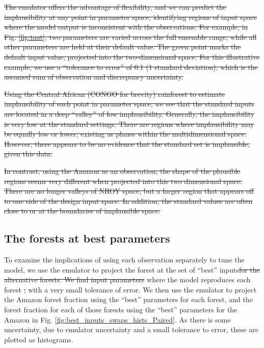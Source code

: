 \documentclass[esd, article]{copernicus} %
\providecommand{\DIFadd}[1]{{\protect\color{blue}\uwave{#1}}} %
\providecommand{\DIFdel}[1]{{\protect\color{red}\sout{#1}}}                      %
\providecommand{\DIFaddbegin}{} %
\providecommand{\DIFaddend}{} %
\providecommand{\DIFdelbegin}{} %
\providecommand{\DIFdelend}{} %
\begin{document}
\DIFdelbegin \DIFdel{The emulator offers the advantage of flexibility, and we can predict the implausibility at any point in parameter space, identifying regions of input space where the model output is inconsistent with the observations. For example, in Fig.  \ref{fig:taat}, two parameters are varied across the full ensemble range, while all other parameters are held at their default value. The green point marks the default input value, projected into the two-dimensional space. For this illustrative example, we use a ``tolerance to error'' of 0.1 (1 standard deviation), which is the assumed sum of observation and discrepancy uncertainty.
}%

\DIFdel{Using the Central African (CONGO for brevity) rainforest to estimate implausibility of each point in parameter space, we see that the standard inputs are located in a deep ``valley'' of low implausibility. Generally, the implausibility is very low at the standard settings. There are regions where implausibility may be equally low or lower, existing as planes within the multidimensional space. However, there appears to be no evidence that the standard set is implausible, given this data.
}%

\DIFdel{In contrast, using the Amazon as an observation, the shape of the plausible regions seems very different when projected into this two dimensional space. There are no longer valleys of NROY space, but a larger region that appears off to one side of the design input space. In addition, the standard values are often close to or at the boundaries of implausible space.
}%


\DIFdelend \subsection{The forests at best parameters}\label{ssec:bestparameters}
To examine the implications of using each observation separately to tune the model, we use the emulator to project the \DIFaddbegin \DIFadd{each }\DIFaddend forest at the set of ``best'' inputs\DIFdelbegin \DIFdel{for the alternative forests. We find input parameters }\DIFdelend \DIFaddbegin \DIFadd{: those }\DIFaddend where the model reproduces each forest \DIFdelbegin \DIFdel{, }\DIFdelend with a very small tolerance of error. We then use the emulator to project the Amazon forest fraction using the ``best'' parameters for each forest, and the forest fraction for each of those forests using the ``best'' parameters for the Amazon in Fig. \ref{fig:best_inputs_swaps_hists_Paired}. As there is some uncertainty, due to emulator uncertainty and a small tolerance to error, these are plotted as histograms.
\end{document}

